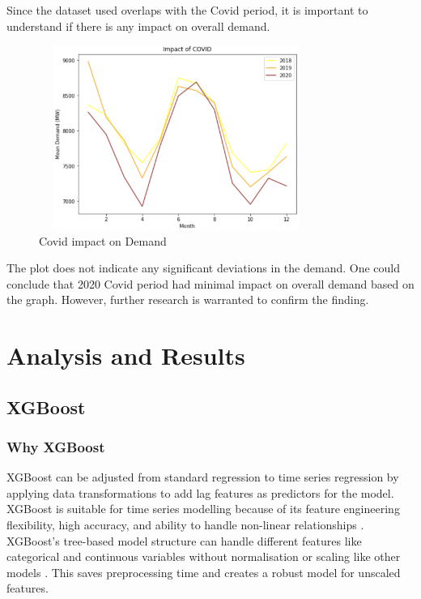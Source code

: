 \documentclass[mstat,12pt]{unswthesis}
\begin{document}
Since the dataset used overlaps with the Covid period, it is important
to understand if there is any impact on overall demand.

\begin{figure}[H]
\centering
\includegraphics[width=0.80\textwidth,height=6cm]{covid_impact.png}
\caption{Covid impact on Demand}
\label{covid_impact}
\end{figure}

The plot does not indicate any significant deviations in the demand. One
could conclude that 2020 Covid period had minimal impact on overall
demand based on the graph. However, further research is warranted to
confirm the finding.

\chapter{Analysis and Results}\label{analysis-and-results}

\section{XGBoost}\label{xgboost}

\subsection{Why XGBoost}\label{why-xgboost}

XGBoost can be adjusted from standard regression to time series
regression by applying data transformations to add lag features as
predictors for the model. XGBoost is suitable for time series modelling
because of its feature engineering flexibility, high accuracy, and
ability to handle non-linear relationships
\cite{brownlee_gradientboosting2020}. XGBoost's tree-based model
structure can handle different features like categorical and continuous
variables without normalisation or scaling like other models
\cite{ambika_2023_xgboost}. This saves preprocessing time and creates a
robust model for unscaled features.
\end{document}
